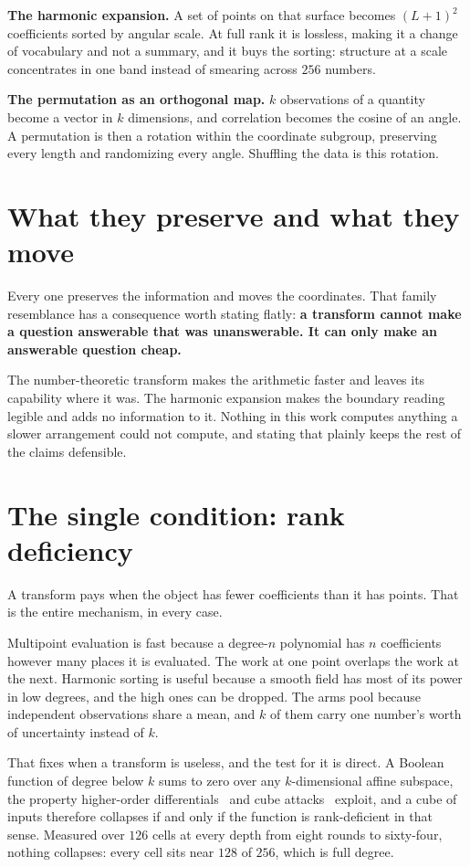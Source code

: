 \textbf{The harmonic expansion.} A set of points on that surface becomes \((L+1)^2\) coefficients sorted by angular scale. At full rank it is lossless, making it a change of vocabulary and not a summary, and it buys the sorting: structure at a scale concentrates in one band instead of smearing across \(256\) numbers.

\textbf{The permutation as an orthogonal map.} \(k\) observations of a quantity become a vector in \(k\) dimensions, and correlation becomes the cosine of an angle. A permutation is then a rotation within the coordinate subgroup, preserving every length and randomizing every angle. Shuffling the data is this rotation.

\section{What they preserve and what they move}

Every one preserves the information and moves the coordinates. That family resemblance has a consequence worth stating flatly: \textbf{a transform cannot make a question answerable that was unanswerable. It can only make an answerable question cheap.}

The number-theoretic transform makes the arithmetic faster and leaves its capability where it was. The harmonic expansion makes the boundary reading legible and adds no information to it. Nothing in this work computes anything a slower arrangement could not compute, and stating that plainly keeps the rest of the claims defensible.

\section{The single condition: rank deficiency}

A transform pays when the object has fewer coefficients than it has points. That is the entire mechanism, in every case.

Multipoint evaluation is fast because a degree-\(n\) polynomial has \(n\) coefficients however many places it is evaluated. The work at one point overlaps the work at the next. Harmonic sorting is useful because a smooth field has most of its power in low degrees, and the high ones can be dropped. The arms pool because independent observations share a mean, and \(k\) of them carry one number's worth of uncertainty instead of \(k\).

That fixes when a transform is useless, and the test for it is direct. A Boolean function of degree below \(k\) sums to zero over any \(k\)-dimensional affine subspace, the property higher-order differentials~\cite{src:Lai-1994} and cube attacks~\cite{src:Dinur-and-Shamir-2009} exploit, and a cube of inputs therefore collapses if and only if the function is rank-deficient in that sense. Measured over \(126\) cells at every depth from eight rounds to sixty-four, nothing collapses: every cell sits near \(128\) of \(256\), which is full degree.

